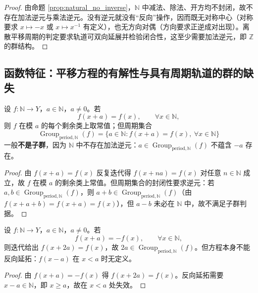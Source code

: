 \begin{proof}
由命题 \ref{prop:natural_no_inverse}，$\mathbb{N}$ 中减法、除法、开方均不封闭，故不存在加法逆元与乘法逆元。没有逆元就没有“反向”操作，因而既无对称中心（对称要求 $x \mapsto -x$ 或 $x \mapsto x^{-1}$ 有定义），也无方向对偶（方向要求正逆成对出现）。离散平移周期的判定要求轨道可双向延展并检验闭合性，这至少需要加法逆元，即 $\mathbb{Z}$ 的群结构。
\end{proof}

\subsection{\texorpdfstring{函数特征：平移方程的有解性与具有周期轨道的群的缺失}{函数特征：平移方程的有解性与具有周期轨道的群的缺失}}

\begin{proposition}[自然数中平移方程的解]\label{prop:translation_equation_N}
设 $f:\mathbb{N}\to Y$，$a\in\mathbb{N}$，$a\ne0$。若
\[
f(x+a)=f(x),\qquad \forall x\in\mathbb{N},
\]
则 $f$ 在模 $a$ 的每个剩余类上取常值；但周期集合
\[
\operatorname{Group}_{\mathrm{period},\mathbb{N}}(f)=\{a\in\mathbb{N}: f(x+a)=f(x),\ \forall x\in\mathbb{N}\}
\]
一般\textbf{不是子群}，因为 $\mathbb{N}$ 中不存在加法逆元：$a\in\operatorname{Group}_{\mathrm{period},\mathbb{N}}(f)$ 不蕴含 $-a$ 存在。
\end{proposition}

\begin{proof}
由 $f(x+a)=f(x)$ 反复迭代得 $f(x+na)=f(x)$ 对任意 $n\in\mathbb{N}$ 成立，故 $f$ 在模 $a$ 的剩余类上常值。但周期集合的封闭性要求逆元：若 $a,b\in\operatorname{Group}_{\mathrm{period},\mathbb{N}}(f)$，则 $a+b\in\operatorname{Group}_{\mathrm{period},\mathbb{N}}(f)$（由 $f(x+a+b)=f(x+a)=f(x)$），但 $a-b$ 未必在 $\mathbb{N}$ 中，故不满足子群判据。
\end{proof}

\begin{proposition}[自然数中反周期方程的失效]\label{prop:antiperiod_N}
设 $f:\mathbb{N}\to Y$，$a\in\mathbb{N}$，$a\ne0$。若
\[
f(x+a)=-f(x),\qquad \forall x\in\mathbb{N},
\]
则迭代给出 $f(x+2a)=f(x)$，故 $2a\in\operatorname{Group}_{\mathrm{period},\mathbb{N}}(f)$。但方程本身不能反向延拓：$f(x-a)$ 在 $x<a$ 时无定义。
\end{proposition}

\begin{proof}
由 $f(x+a)=-f(x)$ 得 $f(x+2a)=f(x)$。反向延拓需要 $x-a\in\mathbb{N}$，即 $x\ge a$，故在 $x<a$ 处失效。
\end{proof}

